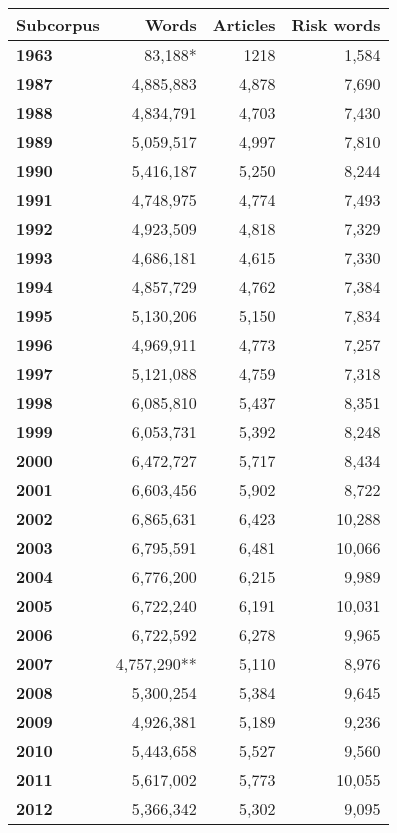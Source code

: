 \begin{table}
\begin{tabular}{p{1.5cm}rrr}
\toprule
\textbf{Subcorpus} & \textbf{Words} & \textbf{Articles} & \textbf{Risk words}  \\ \midrule
\textbf{1963} & 83,188* & 1218 &  1,584  \\ 
\textbf{1987} & 4,885,883 & 4,878 &  7,690  \\ 
\textbf{1988} & 4,834,791 & 4,703 &  7,430  \\ 
\textbf{1989} & 5,059,517 & 4,997 &  7,810  \\ 
\textbf{1990} & 5,416,187 & 5,250 &  8,244  \\ 
\textbf{1991} & 4,748,975 & 4,774 &  7,493  \\ 
\textbf{1992} & 4,923,509 & 4,818 &  7,329  \\ 
\textbf{1993} & 4,686,181 & 4,615 &  7,330  \\ 
\textbf{1994} & 4,857,729 & 4,762 &  7,384  \\ 
\textbf{1995} & 5,130,206 & 5,150 &  7,834  \\ 
\textbf{1996} & 4,969,911 & 4,773 &  7,257  \\ 
\textbf{1997} & 5,121,088 & 4,759 &  7,318  \\ 
\textbf{1998} & 6,085,810 & 5,437 &  8,351  \\ 
\textbf{1999} & 6,053,731 & 5,392 &  8,248  \\ 
\textbf{2000} & 6,472,727 & 5,717 &  8,434  \\ 
\textbf{2001} & 6,603,456 & 5,902 &  8,722  \\ 
\textbf{2002} & 6,865,631 & 6,423 & 10,288  \\ 
\textbf{2003} & 6,795,591 & 6,481 & 10,066  \\ 
\textbf{2004} & 6,776,200 & 6,215 &  9,989  \\ 
\textbf{2005} & 6,722,240 & 6,191 & 10,031  \\ 
\textbf{2006} & 6,722,592 & 6,278 &  9,965  \\ 
\textbf{2007} & 4,757,290** & 5,110 &  8,976  \\ 
\textbf{2008} & 5,300,254 & 5,384 &  9,645  \\ 
\textbf{2009} & 4,926,381 & 5,189 &  9,236  \\ 
\textbf{2010} & 5,443,658 & 5,527 &  9,560  \\ 
\textbf{2011} & 5,617,002 & 5,773 & 10,055  \\ 
\textbf{2012} & 5,366,342 & 5,302 &  9,095  \\ 

\end{tabular}
\end{table}
